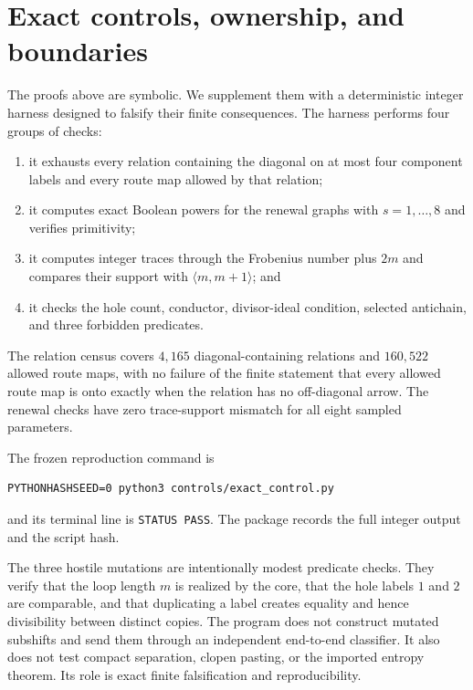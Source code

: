 \section{Exact controls, ownership, and boundaries}
\label{sec:controls}

The proofs above are symbolic.  We supplement them with a deterministic
integer harness designed to falsify their finite consequences.  The harness
performs four groups of checks:

\begin{enumerate}[label=(\roman*)]
  \item it exhausts every relation containing the diagonal on at most four
  component labels and every route map allowed by that relation;
  \item it computes exact Boolean powers for the renewal graphs with
  $s=1,\ldots,8$ and verifies primitivity;
  \item it computes integer traces through the Frobenius number plus $2m$ and
  compares their support with $\langle m,m+1\rangle$; and
  \item it checks the hole count, conductor, divisor-ideal condition, selected
  antichain, and three forbidden predicates.
\end{enumerate}

The relation census covers $4{,}165$ diagonal-containing relations and
$160{,}522$ allowed route maps, with no failure of the finite statement that
every allowed route map is onto exactly when the relation has no
off-diagonal arrow.  The renewal checks have zero trace-support mismatch for
all eight sampled parameters.

The frozen reproduction command is
\begin{verbatim}
PYTHONHASHSEED=0 python3 controls/exact_control.py
\end{verbatim}
and its terminal line is \texttt{STATUS PASS}.  The package records the full
integer output and the script hash.

The three hostile mutations are intentionally modest predicate checks.  They
verify that the loop length $m$ is realized by the core, that the hole labels
$1$ and $2$ are comparable, and that duplicating a label creates equality and
hence divisibility between distinct copies.  The program does not construct
mutated subshifts and send them through an independent end-to-end classifier.
It also does not test compact separation, clopen pasting, or the imported
entropy theorem.  Its role is exact finite falsification and reproducibility.

